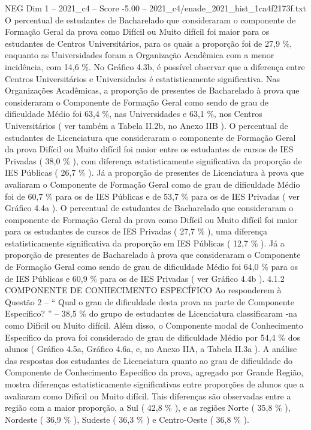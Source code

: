 \begin{textsample}{NEG Dim 1 – 2021\_c4 – Score -5.00 – 2021\_c4/enade\_2021\_hist\_1ca4f2173f.txt}
O percentual de estudantes de Bacharelado que consideraram o componente de Formação Geral da prova como Difícil ou Muito difícil foi maior para os estudantes de Centros Universitários, para os quais a proporção foi de 27,9 \%, enquanto as Universidades foram a Organização Acadêmica com a menor incidência, com 14,6 \%.
No Gráfico 4.3b, é possível observar que a diferença entre Centros Universitários e Universidades é estatisticamente significativa.
Nas Organizações Acadêmicas, a proporção de presentes de Bacharelado à prova que consideraram o Componente de Formação Geral como sendo de grau de dificuldade Médio foi 63,4 \%, nas Universidades e 63,1 \%, nos Centros Universitários ( ver também a Tabela II.2b, no Anexo IIB ).
O percentual de estudantes de Licenciatura que consideraram o componente de Formação Geral da prova Difícil ou Muito difícil foi maior entre os estudantes de cursos de IES Privadas ( 38,0 \% ), com diferença estatisticamente significativa da proporção de IES Públicas ( 26,7 \% ).
Já a proporção de presentes de Licenciatura à prova que avaliaram o Componente de Formação Geral como de grau de dificuldade Médio foi de 60,7 \% para os de IES Públicas e de 53,7 \% para os de IES Privadas ( ver Gráfico 4.4a ).
O percentual de estudantes de Bacharelado que consideraram o componente de Formação Geral da prova como Difícil ou Muito difícil foi maior para os estudantes de cursos de IES Privadas ( 27,7 \% ), uma diferença estatisticamente significativa da proporção em IES Públicas ( 12,7 \% ).
Já a proporção de presentes de Bacharelado à prova que consideraram o Componente de Formação Geral como sendo de grau de dificuldade Médio foi 64,0 \% para os de IES Públicas e 60,9 \% para os de IES Privadas ( ver Gráfico 4.4b ). 4.1.2 COMPONENTE DE CONHECIMENTO ESPECÍFICO Ao responderem à Questão 2 – “ Qual o grau de dificuldade desta prova na parte de Componente Específico? ” – 38,5 \% do grupo de estudantes de Licenciatura classificaram -na como Difícil ou Muito difícil.
Além disso, o Componente modal de Conhecimento Específico da prova foi considerado de grau de dificuldade Médio por 54,4 \% dos alunos ( Gráfico 4.5a, Gráfico 4.6a, e, no Anexo IIA, a Tabela II.3a ).
A análise das respostas dos estudantes de Licenciatura quanto ao grau de dificuldade do Componente de Conhecimento Específico da prova, agregado por Grande Região, mostra diferenças estatisticamente significativas entre proporções de alunos que a avaliaram como Difícil ou Muito difícil.
Tais diferenças são observadas entre a região com a maior proporção, a Sul ( 42,8 \% ), e as regiões Norte ( 35,8 \% ), Nordeste ( 36,9 \% ), Sudeste ( 36,3 \% ) e Centro-Oeste ( 36,8 \% ).

\end{textsample}
